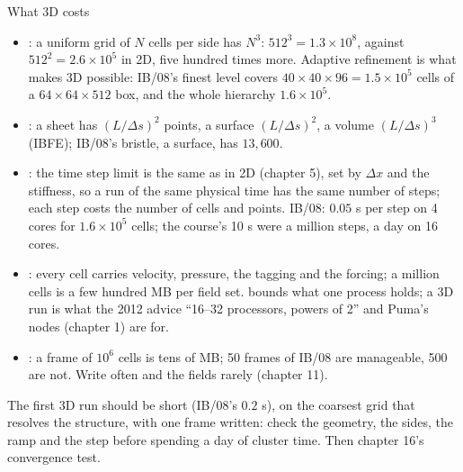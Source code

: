 \documentclass[aspectratio=169,11pt]{beamer}
\begin{document}
\begin{frame}{What 3D costs}
\label{fr:cost}
\footnotesize
\begin{itemize}
  \item {}: a uniform grid of $N$ cells per side has $N^3$: $512^3 = 1.3\times10^8$, against $512^2 = 2.6\times10^5$ in 2D, five hundred times more. Adaptive refinement is what makes 3D possible: IB/08's finest level covers $40\times40\times96 = 1.5\times10^5$ cells of a $64\times64\times512$ box, and the whole hierarchy $1.6\times10^5$.
  \item {}: a sheet has $(L/\Delta s)^2$ points, a surface $(L/\Delta s)^2$, a volume $(L/\Delta s)^3$ (IBFE); IB/08's bristle, a surface, has $13{,}600$.
  \item {}: the time step limit is the same as in 2D (chapter 5), set by $\Delta x$ and the stiffness, so a run of the same physical time has the same number of steps; each step costs the number of cells and points. IB/08: $0.05$ s per step on 4 cores for $1.6\times10^5$ cells; the course's 10 s were a million steps, a day on 16 cores.
  \item {}: every cell carries velocity, pressure, the tagging and the forcing; a million cells is a few hundred MB per field set.  bounds what one process holds; a 3D run is what the 2012 advice ``16--32 processors, powers of 2'' and Puma's nodes (chapter 1) are for.
  \item {}: a  frame of $10^6$ cells is tens of MB; 50 frames of IB/08 are manageable, 500 are not. Write  often and the fields rarely (chapter 11).
\end{itemize}
\begin{punchbox}
\footnotesize The first 3D run should be short (IB/08's $0.2$ s), on the coarsest grid that resolves the structure, with one frame written: check the geometry, the sides, the ramp and the step before spending a day of cluster time. Then chapter 16's convergence test.
\end{punchbox}
\end{frame}
\end{document}
